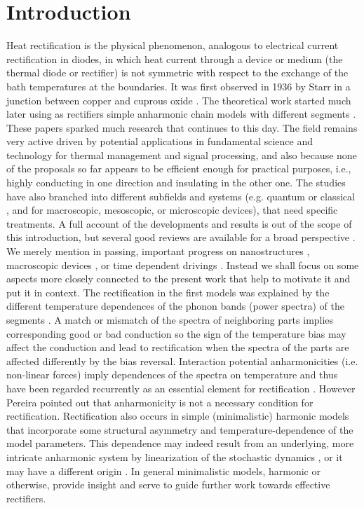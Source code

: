 \section{Introduction \label{sec:Introduction}}
%
Heat rectification is the physical phenomenon, analogous to electrical current rectification in diodes, in which heat current through a device or medium (the thermal diode or rectifier) is not symmetric with respect to the exchange of the bath temperatures at the boundaries. It was  first observed in 1936 by Starr in a junction between copper and
cuprous oxide \cite{Starr1936}. The theoretical work started much later  using as rectifiers simple anharmonic chain models
with different segments \cite{Terraneo2002,Li2004}.
These papers sparked much research that
continues to this day. The field remains very active driven by potential applications in fundamental science and technology for thermal management and signal processing, and also because
none of the proposals so far appears to be efficient enough for
practical purposes, i.e., highly conducting in one direction and insulating in the other one. The studies have also branched into different subfields
and systems (e.g. quantum or  classical \cite{Pereira2019}, and for macroscopic, mesoscopic,  or microscopic devices),
that need  specific treatments. A full account of the
developments and results is out of the scope of this introduction, but  several good reviews  are available for a broad perspective  \cite{Roberts2011,Li2012,Pereira2019,Ma2019}. We merely mention in passing,  important  progress on
nanostructures \cite{Li2012,Ma2019},
macroscopic devices \cite{Roberts2011},  or time dependent drivings \cite{Li2012,Riera-Campeny2019}.
Instead we shall focus  on some aspects more closely connected to the present work that help to  motivate it and put it in context.
The rectification in the first  models was explained by the different temperature dependences of the phonon bands (power spectra) of the  segments  \cite{Terraneo2002,Li2004}. A match or mismatch of the spectra of neighboring parts implies corresponding good or bad conduction so the
sign of the temperature bias may affect the conduction and lead to rectification when the spectra of the parts are affected differently
by the bias reversal. Interaction potential anharmonicities (i.e. non-linear forces) imply dependences of the spectra on temperature and thus have been regarded recurrently as an essential element for rectification   \cite{Li2012,Li2008,Hu2006,Zeng2008,Segal2005,Segal2005b,Katz2016,Benenti2016}.
However Pereira pointed out \cite{Pereira2017} that anharmonicity is not a necessary condition for rectification.
Rectification also occurs in simple (minimalistic) harmonic models
that incorporate some structural asymmetry and temperature-dependence of the model parameters. This dependence may indeed result from
an underlying, more intricate  anharmonic  system by linearization of the stochastic dynamics \cite{Pereira2017,Pereira2019},
or it may have a different origin \cite{Simon2019}.
In general minimalistic models, harmonic or otherwise,  provide insight and serve to guide further work towards effective rectifiers.

